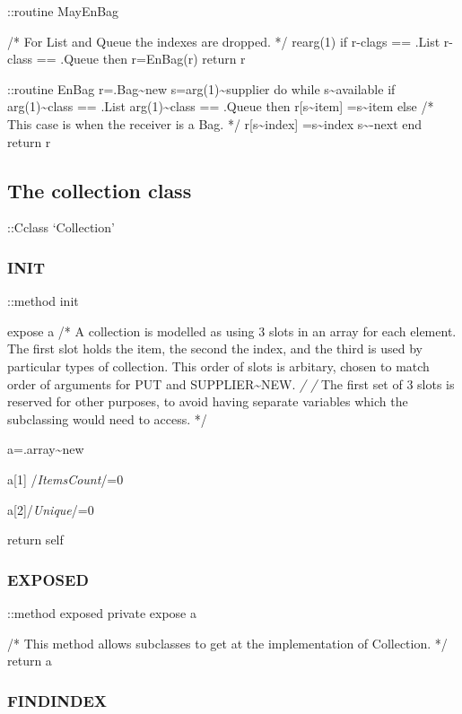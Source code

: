 ::routine MayEnBag

/* For List and Queue the indexes are dropped. */ rearg(1) if r-clags ==
.List \textbar{} r-class == .Queue then r=EnBag(r) return r

::routine EnBag r=.Bag\textasciitilde new
s=arg(1)\textasciitilde supplier do while s\textasciitilde available if
arg(1)\textasciitilde class == .List \textbar{}
arg(1)\textasciitilde class == .Queue then r{[}s\textasciitilde item{]}
=s\textasciitilde item else /* This case is when the receiver is a Bag.
*/ r{[}s\textasciitilde index{]} =s\textasciitilde index
s\textasciitilde-next end return r

\hypertarget{the-collection-class}{%
\subsection{The collection class}\label{the-collection-class}}

::Cclass `Collection'

\hypertarget{init}{%
\subsubsection{INIT}\label{init}}

::method init

expose a /* A collection is modelled as using 3 slots in an array for
each element. The first slot holds the item, the second the index, and
the third is used by particular types of collection. This order of slots
is arbitary, chosen to match order of arguments for PUT and
SUPPLIER\textasciitilde NEW. \emph{/ /} The first set of 3 slots is
reserved for other purposes, to avoid having separate variables which
the subclassing would need to access. */

a=.array\textasciitilde new

a{[}1{]} /\emph{ItemsCount}/=0

a{[}2{]}/\emph{Unique}/=0

return self

\hypertarget{exposed}{%
\subsubsection{EXPOSED}\label{exposed}}

::method exposed private expose a

/* This method allows subclasses to get at the implementation of
Collection. */ return a

\hypertarget{findindex}{%
\subsubsection{FINDINDEX}\label{findindex}}

